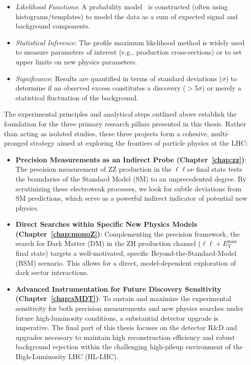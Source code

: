 \begin{itemize}
  \begin{itemize}
    \item \textit{Likelihood Functions}: A probability model~\cite{Fisher1922} is constructed (often using histograms/templates) to model the data as a sum of expected signal and background components.
    \item \textit{Statistical Inference}: The profile maximum likelihood method is widely used to measure parameters of interest (e.g., production cross-sections) or to set upper limits on new physics parameters.
    \item \textit{Significance}: Results are quantified in terms of standard deviations ($\sigma$) to determine if an observed excess constitutes a discovery ($>5\sigma$) or merely a statistical fluctuation of the background.
  \end{itemize}
\end{itemize}


The experimental principles and analytical steps outlined above establish the foundation for the three primary research pillars presented in this thesis. Rather than acting as isolated studies, these three projects form a cohesive, multi-pronged strategy aimed at exploring the frontiers of particle physics at the LHC:
\begin{itemize}
    \item \textbf{Precision Measurements as an Indirect Probe (Chapter~\ref{chap:zz})}: The precision measurement of $\text{ZZ}$ production in the $\ell\ell\nu\nu$ final state tests the boundaries of the Standard Model (SM) to an unprecedented degree. By scrutinizing these electroweak processes, we look for subtle deviations from SM predictions, which serve as a powerful indirect indicator of potential new physics.
    \item \textbf{Direct Searches within Specific New Physics Models (Chapter~\ref{chap:monoZ})}: Complementing the precision framework, the search for Dark Matter (DM) in the $\text{ZH}$ production channel ($\ell\ell + E_{\text{T}}^{\text{miss}}$ final state) targets a well-motivated, specific Beyond-the-Standard-Model (BSM) scenario. This allows for a direct, model-dependent exploration of dark sector interactions.
    \item {\bf Advanced Instrumentation for Future Discovery Sensitivity (Chapter~\ref{chap:sMDT})}: To sustain and maximize the experimental sensitivity for both precision measurements and new physics searches under future high-luminosity conditions, a substantial detector upgrade is imperative. The final part of this thesis focuses on the detector R\&D and upgrades necessary to maintain high reconstruction efficiency and robust background rejection within the challenging high-pileup environment of the High-Luminosity LHC (HL-LHC).
\end{itemize}

